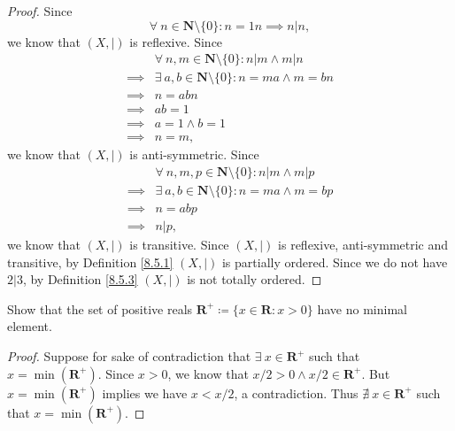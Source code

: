 \begin{proof}
    Since
    \[
        \forall\ n \in \mathbf{N} \setminus \{0\} : n = 1n \implies n | n,
    \]
    we know that \((X, |)\) is reflexive.
    Since
    \begin{align*}
                 & \forall\ n, m \in \mathbf{N} \setminus \{0\} : n | m \land m | n   \\
        \implies & \exists\ a, b \in \mathbf{N} \setminus \{0\} : n = ma \land m = bn \\
        \implies & n = abn                                                            \\
        \implies & ab = 1                                                             \\
        \implies & a = 1 \land b = 1                                                  \\
        \implies & n = m,
    \end{align*}
    we know that \((X, |)\) is anti-symmetric.
    Since
    \begin{align*}
                 & \forall\ n, m, p \in \mathbf{N} \setminus \{0\} : n | m \land m | p \\
        \implies & \exists\ a, b \in \mathbf{N} \setminus \{0\} : n = ma \land m = bp  \\
        \implies & n = abp                                                             \\
        \implies & n | p,
    \end{align*}
    we know that \((X, |)\) is transitive.
    Since \((X, |)\) is reflexive, anti-symmetric and transitive, by Definition \ref{8.5.1} \((X, |)\) is partially ordered.
    Since we do not have \(2 | 3\), by Definition \ref{8.5.3} \((X, |)\) is not totally ordered.
\end{proof}

\begin{exercise}\label{ex 8.5.4}
    Show that the set of positive reals \(\mathbf{R}^+ \coloneqq \{x \in \mathbf{R} : x > 0\}\) have no minimal element.
\end{exercise}

\begin{proof}
    Suppose for sake of contradiction that \(\exists\ x \in \mathbf{R}^+\) such that \(x = \min(\mathbf{R}^+)\).
    Since \(x > 0\), we know that \(x / 2 > 0 \land x / 2 \in \mathbf{R}^+\).
    But \(x = \min(\mathbf{R}^+)\) implies we have \(x < x / 2\), a contradiction.
    Thus \(\nexists\ x \in \mathbf{R}^+\) such that \(x = \min(\mathbf{R}^+)\).
\end{proof}

